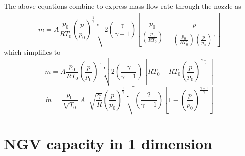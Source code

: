 \documentclass[11pt, twoside]{report}
\begin{document}
The above equations combine to express mass flow rate through the nozzle as
\begin{equation}
\dot{m} =
A
\frac{p_0}{R T_0}
\left(\frac{p}{p_0}\right)^\frac{1}{\gamma}
\sqrt[•]{ 
2 \left( \frac{\gamma}{\gamma - 1} \right) 
\left[ \frac{p_0}{ \left( \frac{p_0}{R T_0} \right) } - \frac{p}{ \left( \frac{p_0}{R T_0} \right) \left(\frac{p}{p_0}\right)^\frac{1}{\gamma} } \right] 
}
\end{equation}
which simplifies to
\begin{equation}
\dot{m} =
A
\frac{p_0}{R T_0}
\left(\frac{p}{p_0}\right)^\frac{1}{\gamma}
\sqrt[•]{
	2 \left( 
		\frac{\gamma}{\gamma - 1} 
	\right)
	\left[ 
		R T_0 - R T_0 \left( \frac{p}{p_0} \right)^\frac{\gamma-1}{\gamma} 
	\right]
}
\end{equation}
\begin{equation}
\dot{m} =
\frac{p_0}{\sqrt[•]{T_0}} \>
A \;
\sqrt[]{\frac{\gamma}{R}}
\left(
    \frac{p}{p_0}
\right)^\frac{1}{\gamma}
\sqrt[•]{
	\left(
		\frac{2}{\gamma - 1}  
	\right)
	\left[
		1 - \left( \frac{p}{p_0} \right)^\frac{\gamma-1}{\gamma}
	\right] 
}
\end{equation}


\section{NGV capacity in 1 dimension}
\end{document}
